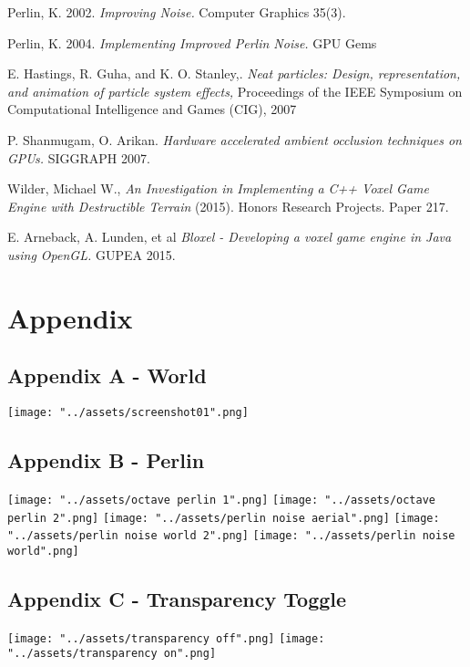 \documentclass{book}
\begin{document}
\nocite{*}
\begin{thebibliography}{1}
	    
	 Perlin, K. 2002. {\em Improving Noise.} Computer Graphics 35(3).
	    
	  Perlin, K. 2004. {\em Implementing Improved Perlin Noise.} GPU Gems
	    
	  E. Hastings, R. Guha, and K. O. Stanley,. {\em Neat particles: Design, representation, and animation of particle system effects,} Proceedings of the IEEE Symposium on Computational Intelligence and Games (CIG), 2007
	  
	 P. Shanmugam, O. Arikan. {\em Hardware accelerated ambient occlusion techniques on GPUs. }  SIGGRAPH 2007.
	    
	  Wilder, Michael W., {\em An Investigation in Implementing a C++ Voxel Game Engine with Destructible Terrain } (2015). Honors Research Projects. Paper 217.
	 
	 E. Arneback, A. Lunden, et al {\em Bloxel - Developing a voxel game engine in Java using OpenGL. } GUPEA 2015.
	     
\end{thebibliography}

    
\newpage
\chapter{Appendix}
\appendix
\section{Appendix A - World} \label{AppendixA}
\centering
\texttt{[image: "../assets/screenshot01".png]}
    
\clearpage
\section{Appendix B - Perlin} \label{AppendixB}
\centering
\texttt{[image: "../assets/octave perlin 1".png]}
\texttt{[image: "../assets/octave perlin 2".png]}
\texttt{[image: "../assets/perlin noise aerial".png]}
\texttt{[image: "../assets/perlin noise world 2".png]}
\texttt{[image: "../assets/perlin noise world".png]}
     
\clearpage
\section{Appendix C - Transparency Toggle} \label{AppendixC}
\centering
\texttt{[image: "../assets/transparency off".png]}
\texttt{[image: "../assets/transparency on".png]}
\end{document}
